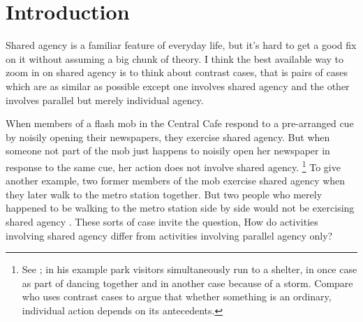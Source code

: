 \documentclass[12pt,\papersize]{extarticle}
\begin{document}
%
%
%
%




\section{Introduction}
Shared agency is a familiar feature of everyday life, but it's hard to get a good fix on it without assuming a big chunk of theory.
I think the best available way to zoom in on shared agency is to think about contrast cases, that is pairs of cases which are as similar as possible except one involves shared agency and the other involves parallel but merely individual agency.

When members of a flash mob in the Central Cafe respond to a pre-arranged cue by noisily opening their newspapers, they exercise shared agency. 
But when someone not part of the mob just happens to noisily open her newspaper in response to the same cue, her action does not involve shared agency.%
\footnote{
See \citet{Searle:1990em}; in his example park visitors simultaneously run to a shelter, in once case as part of dancing together and in another case because of a storm. 
Compare \citet{Pears:1971fk} who uses contrast cases to argue that whether something is an ordinary, individual action depends on its antecedents. 
}
To give another example, 
 two former members of the mob exercise shared agency when they 
   later walk to the metro station together. 
But two people who merely happened to be walking to the metro station side by side would not be exercising shared agency \citep{gilbert_walking_1990}. 
These sorts of case invite the question, 
How do activities involving shared agency differ from activities involving parallel agency only? 
\end{document}
